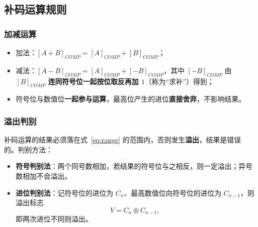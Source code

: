 \subsection{补码运算规则}
\subsubsection{加减运算}
\begin{itemize}
    \item 加法：$[A+B]_{COMP}=[A]_{COMP}+[B]_{COMP}$；
    \item 减法：$[A-B]_{COMP}=[A]_{COMP}+[-B]_{COMP}$，其中 $[-B]_{COMP}$ 由 $[B]_{COMP}$ \textbf{连同符号位一起按位取反再加 $1$}（称为``求补''）得到；
    \item 符号位与数值位\textbf{一起参与运算}，最高位产生的进位\textbf{直接舍弃}，不影响结果。
\end{itemize}

\subsubsection{溢出判别}
补码运算的结果必须落在式~\eqref{eq:range} 的范围内，否则发生\textbf{溢出}，结果是错误的。判别方法：
\begin{itemize}
    \item \textbf{符号判别法}：两个同号数相加，若结果的符号位与之相反，则一定溢出；异号数相加不会溢出。
    \item \textbf{进位判别法}：记符号位的进位为 $C_{n}$、最高数值位向符号位的进位为 $C_{n-1}$，则溢出标志
    \begin{equation}
    V=C_{n}\oplus C_{n-1},
    \label{eq:overflow}
    \end{equation}
    即两次进位不同则溢出。
\end{itemize}

